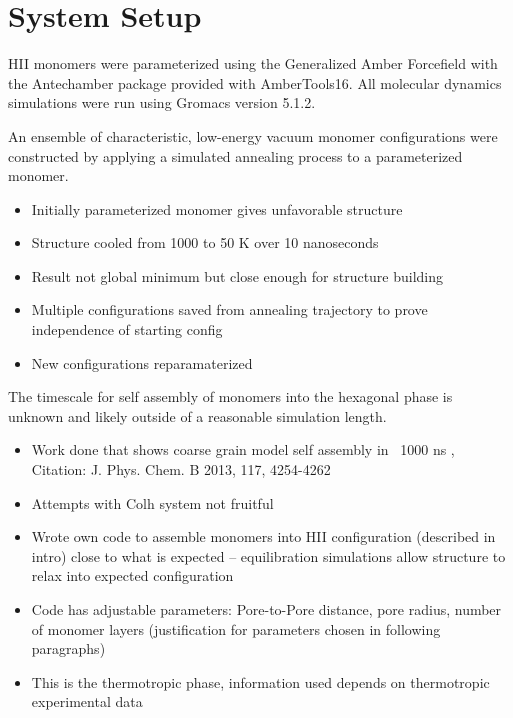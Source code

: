 \documentclass{article}
\begin{document}
	\section{System Setup}
	
	HII monomers were parameterized using the Generalized Amber Forcefield with the Antechamber package provided with AmberTools16. All molecular dynamics simulations were run using Gromacs version 5.1.2.

	An ensemble of characteristic, low-energy vacuum monomer configurations were constructed by applying a simulated annealing process to a parameterized monomer.
	\begin{itemize}
		\item Initially parameterized monomer gives unfavorable structure
		\item Structure cooled from 1000 to 50 K over 10 nanoseconds
		\item Result not global minimum but close enough for structure building
		\item Multiple configurations saved from annealing trajectory to prove independence of starting config
		\item New configurations reparamaterized
	\end{itemize}
	
	The timescale for self assembly of monomers into the hexagonal phase is unknown and likely outside of a reasonable simulation length. 
	\begin{itemize}
		\item Work done that shows coarse grain model self assembly in ~1000 ns , Citation: J. Phys. Chem. B 2013, 117, 4254-4262
		\item Attempts with Colh system not fruitful  
		\item Wrote own code to assemble monomers into HII configuration (described in intro) close to what is expected -- equilibration simulations allow structure to relax into expected configuration 
		\item Code has adjustable parameters: Pore-to-Pore distance, pore radius, number of monomer layers (justification for parameters chosen in following paragraphs)
		\item This is the thermotropic phase, information used depends on thermotropic experimental data
	\end{itemize}
	
\end{document}
